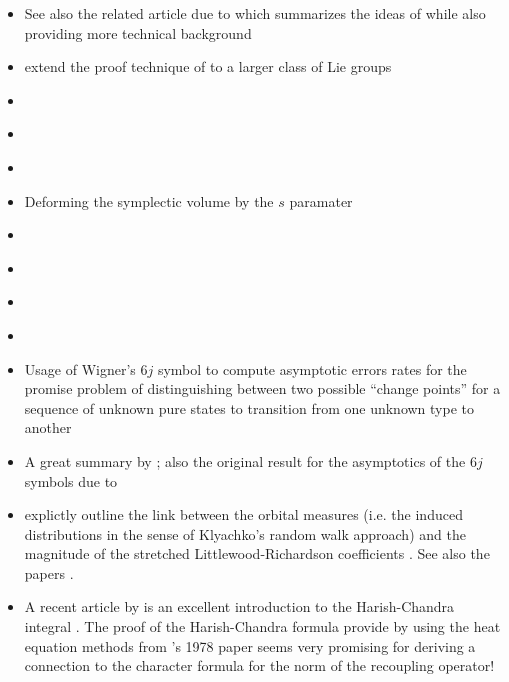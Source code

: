 \documentclass[notitlepage]{article}
\begin{document}
\begin{itemize}
    \item See also the related article due to \citeauthor{lamb2005proof} which summarizes the ideas of \cite{alekseev2001linearization} while also providing more technical background \cite{lamb2005proof}
    \item \citeauthor{lu2003thompson} extend the proof technique of \cite{alekseev2001linearization} to a larger class of Lie groups \cite{lu2003thompson}
    \item \citeauthor{alekseev2017symplectic} \cite{alekseev2017symplectic}
    \item \citeauthor{alekseev2017horn} \cite{alekseev2017horn}
    \item \citeauthor{alekseev2007ginzburg} \cite{alekseev2007ginzburg}
    \item Deforming the symplectic volume by the $s$ paramater \citeauthor{alekseev2018concentration} \cite{alekseev2018concentration}
    \item \citeauthor{klyachko2000random} \cite{klyachko2000random}
    \item \citeauthor{christandl2008quantum} \cite{christandl2008quantum}
    \item \citeauthor{christandl2018recoupling} \cite{christandl2018recoupling}
    \item \citeauthor{kirillov1990representations} \cite{kirillov1990representations}
    \item Usage of Wigner's $6j$ symbol to compute asymptotic errors rates for the promise problem of distinguishing between two possible ``change points'' for a sequence of unknown pure states to transition from one unknown type to another \cite{akimoto2011discrimination}
    \item A great summary by \citeauthor{roberts2002asymptotics} \cite{roberts2002asymptotics}; also the original result for the asymptotics of the $6j$ symbols due to  \citeauthor{roberts1999classical} \cite{roberts1999classical}
    \item {} explictly outline the link between the orbital measures (i.e. the induced distributions in the sense of Klyachko's random walk approach) and the magnitude of the stretched Littlewood-Richardson coefficients \cite{coquereaux2018orbital}. See also the papers \cite{coquereaux2020horn,coquereaux2019revisiting,zuber2018horn}.
    \item A recent article by \citeauthor{mcswiggen2021harish} is an excellent introduction to the Harish-Chandra integral \cite{mcswiggen2021harish}. The proof of the Harish-Chandra formula provide by \citeauthor{mcswiggen2021harish} using the heat equation methods from \citeauthor{fegan1978heat}'s 1978 paper \cite{fegan1978heat} seems very promising for deriving a connection to the character formula for the norm of the recoupling operator!

\end{itemize}
\end{document}
